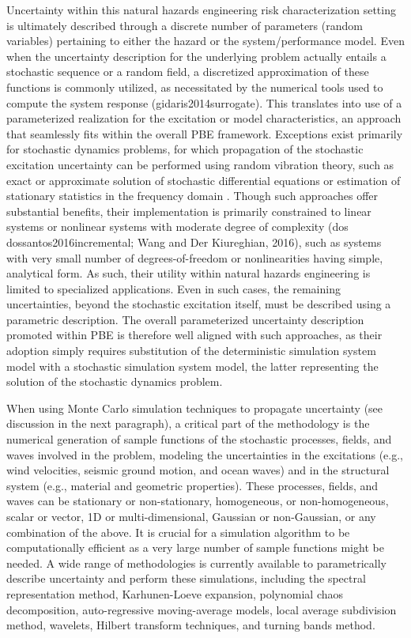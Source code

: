Uncertainty within this natural hazards engineering risk characterization setting is ultimately described through a discrete number of parameters (random variables) pertaining to either the hazard or the system/performance model. Even when the uncertainty description for the underlying problem actually entails a stochastic sequence or a random field, a discretized approximation of these functions is commonly utilized, as necessitated by the numerical tools used to compute the system response (gidaris2014surrogate). This translates into use of a parameterized realization for the excitation or model characteristics, an approach that seamlessly fits within the overall PBE framework. Exceptions exist primarily for stochastic dynamics problems, for which propagation of the stochastic excitation uncertainty can be performed using random vibration theory, such as exact or approximate solution of stochastic differential equations or estimation of stationary statistics in the frequency domain \citep{li2009stochastic}. Though such approaches offer substantial benefits, their implementation is primarily constrained to linear systems or nonlinear systems with moderate degree of complexity (dos dossantos2016incremental; Wang and Der Kiureghian, 2016), such as systems with very small number of degrees-of-freedom or nonlinearities having simple, analytical form. As such, their utility within natural hazards engineering is limited to specialized applications. Even in such cases, the remaining uncertainties, beyond the stochastic excitation itself, must be described using a parametric description. The overall parameterized uncertainty description promoted within PBE is therefore well aligned with such approaches, as their adoption simply requires substitution of the deterministic simulation system model with a stochastic simulation system model, the latter representing the solution of the stochastic dynamics problem.

When using Monte Carlo simulation techniques to propagate uncertainty (see discussion in the next paragraph), a critical part of the methodology is the numerical generation of sample functions of the stochastic processes, fields, and waves involved in the problem, modeling the uncertainties in the excitations (e.g., wind velocities, seismic ground motion, and ocean waves) and in the structural system (e.g., material and geometric properties). These processes, fields, and waves can be stationary or non-stationary, homogeneous, or non-homogeneous, scalar or vector, 1D or multi-dimensional, Gaussian or non-Gaussian, or any combination of the above. It is crucial for a simulation algorithm to be computationally efficient as a very large number of sample functions might be needed. A wide range of methodologies is currently available to parametrically describe uncertainty and perform these simulations, including the spectral representation method, Karhunen-Loeve expansion, polynomial chaos decomposition, auto-regressive moving-average models, local average subdivision method, wavelets, Hilbert transform techniques, and turning bands method.

